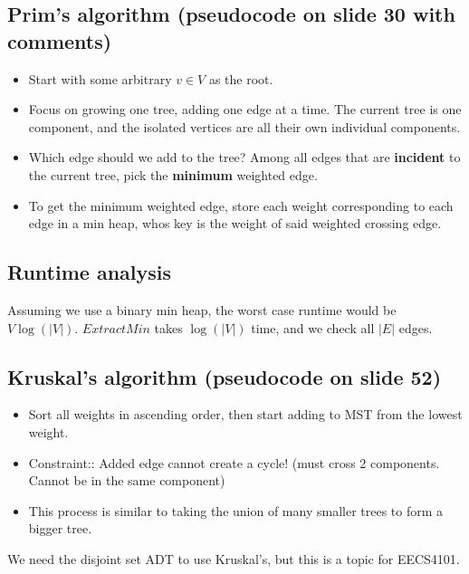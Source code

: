 \documentclass[12pt]{book}
\begin{document}
\subsection*{Prim's algorithm (pseudocode on slide 30 with comments)}
\begin{itemize}
    \item Start with some arbitrary $v\in V$ as the root.
    \item Focus on growing one tree, adding one edge at a time. The current tree is one component, and the isolated vertices are all their own individual components.
    \item Which edge should we add to the tree? Among all edges that are \textbf{incident} to the current tree, pick the \textbf{minimum} weighted edge.
    \item To get the minimum weighted edge, store each weight corresponding to each edge in a min heap, whos key is the weight of said weighted crossing edge.
\end{itemize}

\subsection*{Runtime analysis}
Assuming we use a binary min heap, the worst case runtime would be $V\log(|V|)$. $ExtractMin$ takes $\log(|V|)$ time, and we check all $|E|$ edges.


\subsection*{Kruskal's algorithm (pseudocode on slide 52)}

\begin{itemize}
    \item Sort all weights in ascending order, then start adding to MST from the lowest weight.
    \item Constraint:: Added edge cannot create a cycle! (must cross 2 components. Cannot be in the same component)
    \item This process is similar to taking the union of many smaller trees to form a bigger tree.
\end{itemize}

We need the disjoint set ADT to use Kruskal's, but this is a topic for EECS4101.
\end{document}
